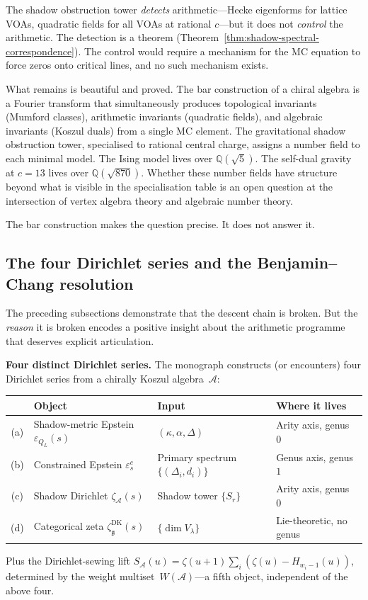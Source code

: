 \documentclass[11pt]{article}
\newcommand{\cA}{\mathcal{A}}
\newcommand{\fg}{\mathfrak{g}}
\newcommand{\Q}{\mathbb{Q}}
\begin{document}
The shadow obstruction tower \emph{detects} arithmetic---Hecke eigenforms
for lattice VOAs, quadratic fields for all VOAs at rational $c$---but
it does not \emph{control} the arithmetic.  The detection is a
theorem (Theorem~\ref{thm:shadow-spectral-correspondence}).  The
control would require a mechanism for the MC equation to force
zeros onto critical lines, and no such mechanism exists.

What remains is beautiful and proved.  The bar construction of a
chiral algebra is a Fourier transform that simultaneously produces
topological invariants (Mumford classes), arithmetic invariants
(quadratic fields), and algebraic invariants (Koszul duals) from
a single MC element.  The gravitational shadow obstruction tower, specialised
to rational central charge, assigns a number field to each minimal
model.  The Ising model lives over $\Q(\sqrt{5})$.  The self-dual
gravity at $c = 13$ lives over $\Q(\sqrt{870})$.  Whether these
number fields have structure beyond what is visible in the
specialisation table is an open question at the intersection of
vertex algebra theory and algebraic number theory.

The bar construction makes the question precise.  It does not
answer it.

\subsection{The four Dirichlet series and the Benjamin--Chang resolution}
\label{sec:four-series-bc-resolution}

The preceding subsections demonstrate that the descent chain
is broken.  But the \emph{reason} it is broken encodes a
positive insight about the arithmetic programme that deserves
explicit articulation.

\textbf{Four distinct Dirichlet series.}
The monograph constructs (or encounters) four Dirichlet series
from a chirally Koszul algebra~$\cA$:
\begin{center}
\small
\renewcommand{\arraystretch}{1.3}
\begin{tabular}{@{}cllp{4.5cm}@{}}
& \textbf{Object} & \textbf{Input}
  & \textbf{Where it lives} \\
\hline
\textup{(a)} & Shadow-metric Epstein $\varepsilon_{Q_L}(s)$
  & $(\kappa, \alpha, \Delta)$
  & Arity axis, genus $0$ \\[3pt]
\textup{(b)} & Constrained Epstein $\varepsilon^c_s$
  & Primary spectrum $\{(\Delta_i, d_i)\}$
  & Genus axis, genus $1$ \\[3pt]
\textup{(c)} & Shadow Dirichlet $\zeta_\cA(s)$
  & Shadow tower $\{S_r\}$
  & Arity axis, genus $0$ \\[3pt]
\textup{(d)} & Categorical zeta $\zeta^{\mathrm{DK}}_\fg(s)$
  & $\{\dim V_\lambda\}$
  & Lie-theoretic, no genus
\end{tabular}
\end{center}
Plus the Dirichlet-sewing lift
$S_\cA(u) = \zeta(u{+}1)\sum_i (\zeta(u) - H_{w_i-1}(u))$,
determined by the weight multiset~$W(\cA)$---a fifth object,
independent of the above four.
\end{document}
